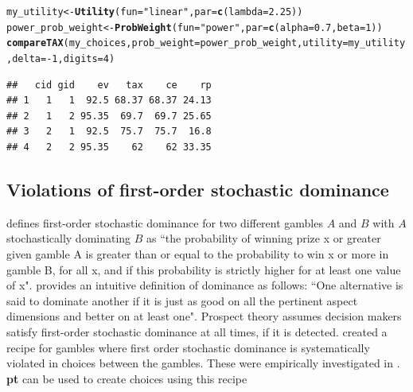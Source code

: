 \documentclass{article}\usepackage[]{graphicx}\usepackage[]{color}
\makeatletter
\newcommand{\hlnum}[1]{\textcolor[rgb]{0.686,0.059,0.569}{#1}}%
\newcommand{\hlstr}[1]{\textcolor[rgb]{0.192,0.494,0.8}{#1}}%
\newcommand{\hlopt}[1]{\textcolor[rgb]{0,0,0}{#1}}%
\newcommand{\hlstd}[1]{\textcolor[rgb]{0.345,0.345,0.345}{#1}}%
\newcommand{\hlkwb}[1]{\textcolor[rgb]{0.69,0.353,0.396}{#1}}%
\newcommand{\hlkwc}[1]{\textcolor[rgb]{0.333,0.667,0.333}{#1}}%
\newcommand{\hlkwd}[1]{\textcolor[rgb]{0.737,0.353,0.396}{\textbf{#1}}}%
\newenvironment{kframe}{%
 \def\at@end@of@kframe{}%
 \ifinner\ifhmode%
  \def\at@end@of@kframe{\end{minipage}}%
  \begin{minipage}{\columnwidth}%
 \fi\fi%
 \def\FrameCommand##1{\hskip\@totalleftmargin \hskip-\fboxsep
 \colorbox{shadecolor}{##1}\hskip-\fboxsep
     \hskip-\linewidth \hskip-\@totalleftmargin \hskip\columnwidth}%
 \MakeFramed {\advance\hsize-\width
   \@totalleftmargin\z@ \linewidth\hsize
   \@setminipage}}%
 {\par\unskip\endMakeFramed%
 \at@end@of@kframe}
\newenvironment{knitrout}{}{} %
\makeatother
\begin{document}
\begin{knitrout}
\color{fgcolor}\begin{kframe}
\begin{alltt}
\hlstd{my_utility} \hlkwb{<-} \hlkwd{Utility}\hlstd{(}\hlkwc{fun}\hlstd{=}\hlstr{"linear"}\hlstd{,} \hlkwc{par}\hlstd{=}\hlkwd{c}\hlstd{(}\hlkwc{lambda}\hlstd{=}\hlnum{2.25}\hlstd{))}
\hlstd{power_prob_weight} \hlkwb{<-} \hlkwd{ProbWeight}\hlstd{(}\hlkwc{fun}\hlstd{=}\hlstr{"power"}\hlstd{,} \hlkwc{par}\hlstd{=}\hlkwd{c}\hlstd{(}\hlkwc{alpha}\hlstd{=}\hlnum{0.7}\hlstd{,} \hlkwc{beta}\hlstd{=}\hlnum{1}\hlstd{))}
\hlkwd{compareTAX}\hlstd{(my_choices,} \hlkwc{prob_weight}\hlstd{=power_prob_weight,} \hlkwc{utility}\hlstd{=my_utility,} \hlkwc{delta}\hlstd{=}\hlopt{-}\hlnum{1}\hlstd{,} \hlkwc{digits}\hlstd{=}\hlnum{4}\hlstd{)}
\end{alltt}
\begin{verbatim}
##   cid gid    ev   tax    ce    rp
## 1   1   1  92.5 68.37 68.37 24.13
## 2   1   2 95.35  69.7  69.7 25.65
## 3   2   1  92.5  75.7  75.7  16.8
## 4   2   2 95.35    62    62 33.35
\end{verbatim}
\end{kframe}
\end{knitrout}



\subsection{Violations of first-order stochastic dominance}

\citet[p. 263-264]{Birnbaum_2005b} defines first-order stochastic dominance for two different gambles $A$ and $B$
with $A$ stochastically dominating $B$ as ``the probability of winning prize x or greater given gamble A is greater than or
equal to the probability to win x or more in gamble B, for all x, and if this probability is
strictly higher for at least one value of x".
\citet[][p. 221]{Yates_1990} provides an intuitive definition of dominance as follows: ``One alternative is said to dominate another if it is just as good on all
the pertinent aspect dimensions and better on at least one".
Prospect theory assumes decision makers satisfy first-order stochastic dominance at all times, if it is
detected.
\citet[][p. 74]{Birnbaum_1997} created a recipe for gambles where first order stochastic dominance is systematically
violated in choices between the gambles. These were empirically investigated in \citet[][]{Birnbaum_Navarrete_1998}. 
{\bf pt} can be used to create choices using this recipe
\end{document}
